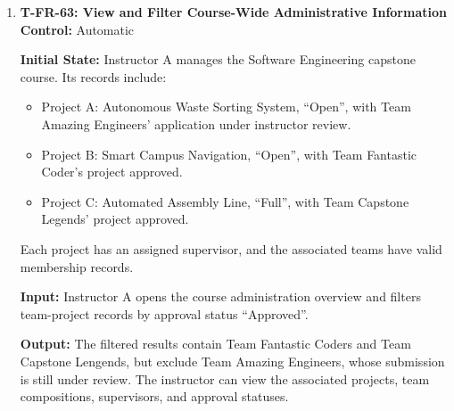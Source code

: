 \documentclass[12pt, titlepage]{article}
\begin{document}
\begin{enumerate}
\textbf{Input:} The configured administrative notification process runs on November 12, 2026.

\textbf{Output:} Student A receives an email identifying the outstanding approval submission and the November 15 deadline. Student B is not incorrectly identified as having an incomplete approval submission.

\textbf{Test Case Derivation:} Derived from \texttt{FR\_ActionRequiredEmail}, which requires configured email notifications for upcoming deadlines and outstanding checklist actions. The reminder occurs three calendar days before the deadline. The scenario verifies that an incomplete required action is identified in a configured reminder without misclassifying a completed action.

\textbf{How Test Will Be Performed:} Configure the reminder, deadline, and student checklist states. Run the notification process using a controlled test clock and capture outgoing email through a test email service. Verify that Student A's reminder identifies the correct action and deadline, and that Student B is not described as having the same outstanding action.

\item \label{T-FR-63}\textbf{T-FR-63: View and Filter Course-Wide Administrative Information}\\

\textbf{Control:} Automatic

\textbf{Initial State:} Instructor A manages the Software Engineering capstone course. Its records include:
\begin{itemize}
    \item Project A: Autonomous Waste Sorting System, ``Open'', with Team Amazing Engineers' application under instructor review.
    \item Project B: Smart Campus Navigation, ``Open'', with Team Fantastic Coder's project approved.
    \item Project C: Automated Assembly Line, ``Full'', with Team Capstone Legends' project approved.
\end{itemize}
Each project has an assigned supervisor, and the associated teams have valid membership records.

\textbf{Input:} Instructor A opens the course administration overview and filters team-project records by approval status ``Approved''.

\textbf{Output:} The filtered results contain Team Fantastic Coders and Team Capstone Lengends, but exclude Team Amazing Engineers, whose submission is still under review. The instructor can view the associated projects, team compositions, supervisors, and approval statuses.


\end{enumerate}
\end{document}
